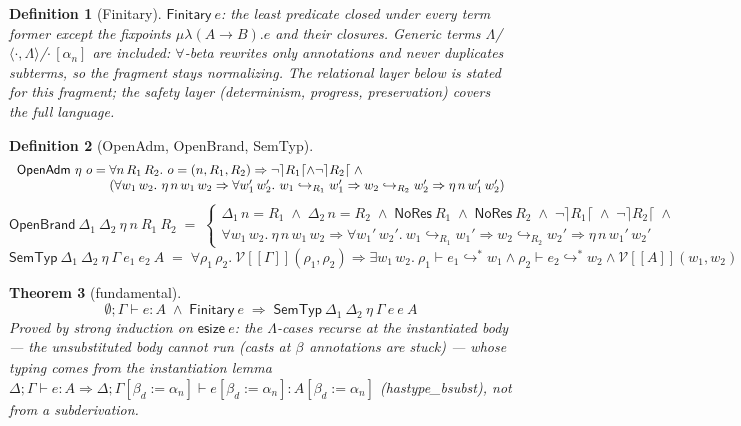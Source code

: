 \documentclass[10pt]{article}
\newtheorem{theorem}{Theorem}[section]
\newtheorem{definition}[theorem]{Definition}
\newcommand{\bra}[1]{\alpha_{#1}}
\newcommand{\subs}[3]{#1[#2{:=}#3]}
\newcommand{\tl}[1]{\rceil #1\lceil}
\newcommand{\msteps}[3]{#1 \vdash #2 \hookrightarrow^{*} #3}
\newcommand{\cast}[3]{#1 \hookrightarrow_{#2} #3}
\newcommand{\hast}[4]{#1; #2 \vdash #3 : #4}
\newcommand{\sT}[1]{[\![#1]\!]}
\newcommand{\LRc}[1]{\mathcal{V}\sT{#1}}
\newcommand{\bv}[1]{\beta_{#1}}
\newcommand{\bapp}[2]{#1\,[\bra{#2}]}
\begin{document}
\begin{definition}[\textsf{Finitary}]
$\mathsf{Finitary}\ e$: the least predicate closed under every term former
\emph{except} the fixpoints $\mu\lambda(A{\to}B).e$ and their closures.  Generic terms
$\Lambda$/$\langle\cdot,\Lambda\rangle$/$\bapp{\cdot}{n}$ \emph{are} included:
$\forall$-beta rewrites only annotations and never duplicates subterms, so the fragment
stays normalizing.  The relational layer below is stated for this fragment; the safety
layer (determinism, progress, preservation) covers the full language.
\end{definition}

\begin{definition}[\textsf{OpenAdm}, \textsf{OpenBrand}, \textsf{SemTyp}]
\[
\begin{array}{r@{\;}c@{\;}l}
\mathsf{OpenAdm}\ \eta\ o &=& \forall n\,R_1\,R_2.\ o = (n,R_1,R_2) \Rightarrow
  \neg\tl{R_1} \wedge \neg\tl{R_2} \;\wedge \\
&& (\forall w_1\,w_2.\ \eta\,n\,w_1\,w_2 \Rightarrow \forall w_1'\,w_2'.\ \cast{w_1}{R_1}{w_1'} \Rightarrow \cast{w_2}{R_2}{w_2'} \Rightarrow \eta\,n\,w_1'\,w_2')
\end{array}
\]
\[
\mathsf{OpenBrand}\ \Delta_1\ \Delta_2\ \eta\ n\ R_1\ R_2 \;=\;
\left\{
\begin{array}{l}
\Delta_1\,n = R_1 \;\wedge\; \Delta_2\,n = R_2 \;\wedge\; \mathsf{NoRes}\ R_1 \;\wedge\; \mathsf{NoRes}\ R_2 \;\wedge\; \neg\tl{R_1} \;\wedge\; \neg\tl{R_2} \;\wedge \\
\forall w_1\,w_2.\ \eta\,n\,w_1\,w_2 \Rightarrow \forall w_1'\,w_2'.\ \cast{w_1}{R_1}{w_1'} \Rightarrow \cast{w_2}{R_2}{w_2'} \Rightarrow \eta\,n\,w_1'\,w_2'
\end{array}
\right.
\]
\[
\mathsf{SemTyp}\ \Delta_1\ \Delta_2\ \eta\ \Gamma\ e_1\ e_2\ A \;=\;
\forall \rho_1\,\rho_2.\ \LRc{\Gamma}(\rho_1,\rho_2) \Rightarrow
\exists w_1\,w_2.\ \msteps{\rho_1}{e_1}{w_1} \wedge \msteps{\rho_2}{e_2}{w_2} \wedge \LRc{A}(w_1,w_2)
\]
\end{definition}

\begin{theorem}[\textsf{fundamental}]
\[
\hast{\emptyset}{\Gamma}{e}{A} \;\wedge\; \mathsf{Finitary}\ e \;\Longrightarrow\; \mathsf{SemTyp}\ \Delta_1\ \Delta_2\ \eta\ \Gamma\ e\ e\ A
\]
Proved by strong induction on $\mathsf{esize}\ e$: the $\Lambda$-cases recurse at the
\emph{instantiated} body — the unsubstituted body cannot run (casts at $\bv{}$
annotations are stuck) — whose typing comes from the instantiation lemma
$\hast{\Delta}{\Gamma}{e}{A} \Rightarrow
\hast{\Delta}{\subs{\Gamma}{\bv{d}}{\bra{n}}}{\subs{e}{\bv{d}}{\bra{n}}}{\subs{A}{\bv{d}}{\bra{n}}}$
(\textsf{hastype\_bsubst}), not from a subderivation.
\end{theorem}
\end{document}
